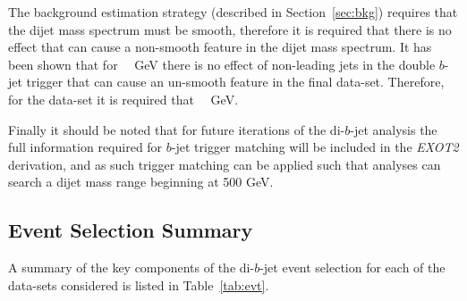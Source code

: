 The background estimation strategy (described in Section~\ref{sec:bkg}) requires that the dijet mass spectrum must be smooth,
therefore it is required that there is no effect that can cause a non-smooth feature in the dijet mass spectrum.
It has been shown that for~\mjj~ GeV there is no effect of non-leading jets in the double $b$-jet trigger
that can cause an un-smooth feature in the final data-set.
Therefore, for the \lm{} data-set it is required that~\mjj~ GeV.

Finally it should be noted that for future iterations of the di-$b$-jet analysis
the full information required for $b$-jet trigger matching will be included in the \textit{EXOT2} derivation,
and as such trigger matching can be applied such that analyses can search a dijet mass range beginning at 500 GeV.

\newpage 
\subsection{Event Selection Summary}
\label{sec:evt-sel-acc}

A summary of the  key components of the di-$b$-jet event selection
for each of the data-sets considered
is listed in Table~\ref{tab:evt}.

